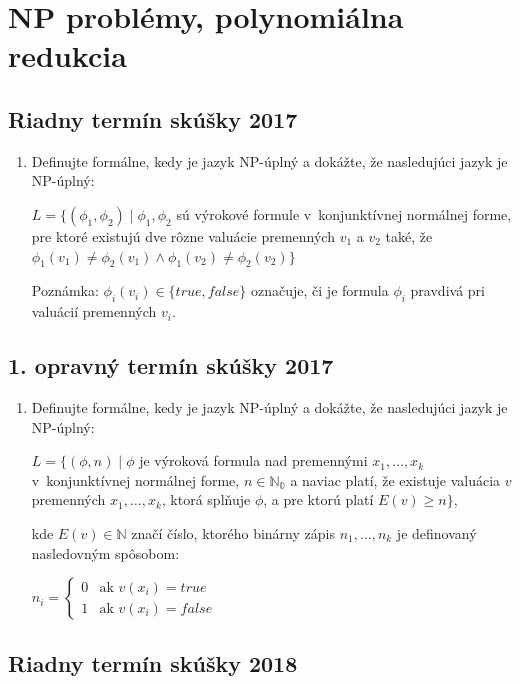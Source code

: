 \documentclass[11pt,a4paper]{article}
\begin{document}
	\section{NP problémy, polynomiálna redukcia}

		\subsection{Riadny termín skúšky 2017}

		\begin{enumerate}
			\item Definujte formálne, kedy je jazyk NP-úplný a dokážte, že nasledujúci jazyk je NP-úplný:
	
			$L = \{(\phi_1, \phi_2) \mid \phi_1, \phi_2$ sú výrokové formule v~konjunktívnej normálnej forme, pre ktoré existujú dve rôzne valuácie premenných $v_1$ a $v_2$ také, že $\phi_1(v_1) \neq \phi_2(v_1) \land \phi_1(v_2) \neq \phi_2(v_2)\}$
	
			Poznámka: $\phi_i(v_i) \in \{true, false\}$ označuje, či je formula $\phi_i$ pravdivá pri valuácií premenných $v_i$.
		\end{enumerate}	

		\subsection{1. opravný termín skúšky 2017}

		\begin{enumerate}
			\item Definujte formálne, kedy je jazyk NP-úplný a dokážte, že nasledujúci jazyk je NP-úplný:

			$L = \{(\phi, n) \mid \phi$ je výroková formula nad premennými $x_1, \ldots, x_k$ v~konjunktívnej normálnej forme, $n \in \mathbb{N_0}$ a naviac platí, že existuje valuácia $v$ premenných $x_1, \ldots, x_k$, ktorá splňuje $\phi$, a pre ktorú platí $E(v) \geq n\}$,
	
			kde $E(v) \in \mathbb{N}$ značí číslo, ktorého binárny zápis $n_1, \ldots, n_k$ je definovaný nasledovným spôsobom:
	
			$n_i =
			\left\{
			\begin{array}{ll}
				0  & \mbox{ak } v(x_i) = true \\
				1 & \mbox{ak } v(x_i) = false
			\end{array}
			\right.$
		\end{enumerate}	

		\subsection{Riadny termín skúšky 2018}
\end{document}
